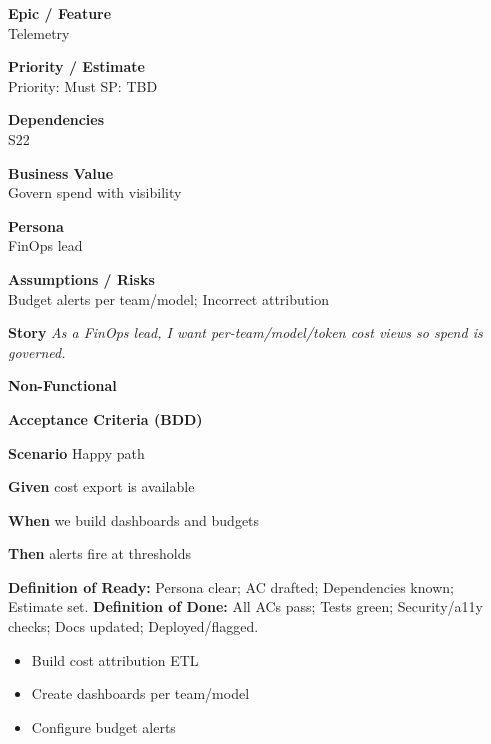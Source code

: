 \documentclass[11pt,a4paper]{article}
\newenvironment{StoryCard}[2][]{
  \begin{tcolorbox}[enhanced, breakable, sharp corners=all, colback=cardback, colframe=cardframe,
    title={#2}, fonttitle=\bfseries\large, boxrule=0.6pt, borderline west={2pt}{0pt}{accent}, #1]
}{
  \end{tcolorbox}
}
\newcommand{\badge}[1]{\pill{\footnotesize #1}}
\newcommand{\cb}{\(\square\)}
\newenvironment{TasksBox}[1][Tasks]{%
  \begin{tcolorbox}[enhanced,breakable,
    colback=cardback, colframe=cardframe, title={#1},
    borderline west={1.8pt}{0pt}{MidnightBlue},
    arc=2pt, boxrule=0.4pt,
    left=10pt,right=10pt,top=6pt,bottom=6pt,
    before skip=6pt, after skip=10pt
  ]
  \small
  \begin{itemize}[label=\cb, leftmargin=*, labelsep=0.6em, itemsep=4pt, topsep=2pt, parsep=0pt]
}{%
  \end{itemize}
  \end{tcolorbox}
}
\begin{document}
\begin{StoryCard}{S24 — Cost dashboards \& budgets}
\noindent\begin{minipage}[t]{0.49\textwidth}
\textbf{Epic / Feature}\\
Telemetry

\medskip
\textbf{Priority / Estimate}\\
Priority: Must \quad SP: TBD

\medskip
\textbf{Dependencies}\\
S22
\end{minipage}\hfill
\begin{minipage}[t]{0.49\textwidth}
\textbf{Business Value}\\
Govern spend with visibility

\medskip
\textbf{Persona}\\
FinOps lead

\medskip
\textbf{Assumptions / Risks}\\
Budget alerts per team/model; Incorrect attribution
\end{minipage}

\medskip
\textbf{Story} \emph{As a FinOps lead, I want per-team/model/token cost views so spend is governed.}

\medskip
\textbf{Non-Functional}
\badge{Cost}\ \badge{Reliability}

\medskip
\textbf{Acceptance Criteria (BDD)}\par
\textbf{Scenario} Happy path\par
\textbf{Given} cost export is available\par
\textbf{When} we build dashboards and budgets\par
\textbf{Then} alerts fire at thresholds\par
\medskip
\footnotesize \textbf{Definition of Ready:} Persona clear; AC drafted; Dependencies known; Estimate set.\quad
\textbf{Definition of Done:} All ACs pass; Tests green; Security/a11y checks; Docs updated; Deployed/flagged.
\end{StoryCard}

\begin{TasksBox}[Tasks]
  \item Build cost attribution ETL
  \item Create dashboards per team/model
  \item Configure budget alerts
\end{TasksBox}
\clearpage
\end{document}
